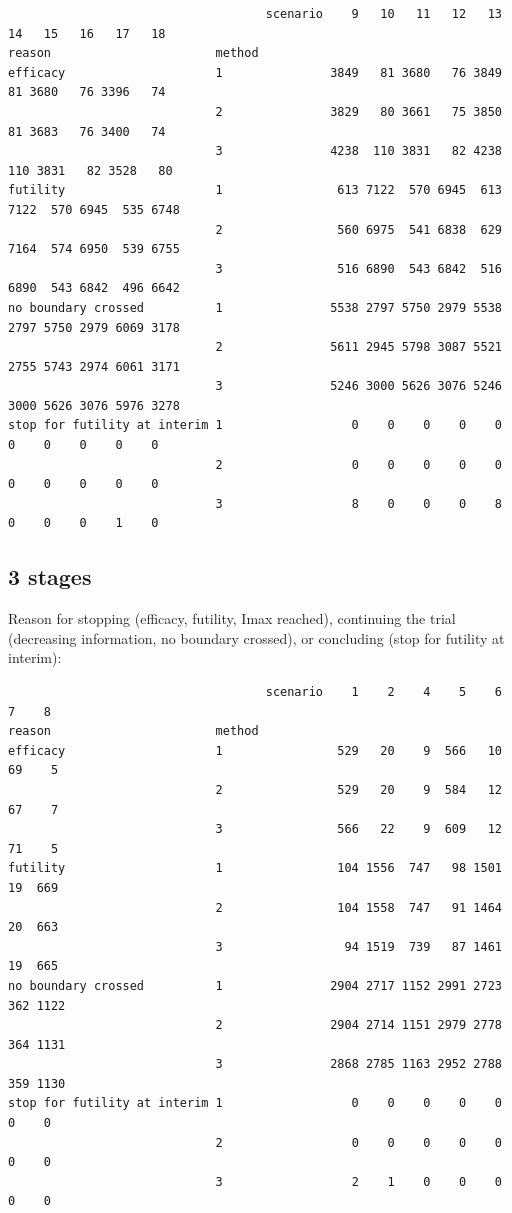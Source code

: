 \documentclass[12pt]{article}
\begin{document}
\begin{verbatim}
                                    scenario    9   10   11   12   13   14   15   16   17   18
reason                       method                                                           
efficacy                     1               3849   81 3680   76 3849   81 3680   76 3396   74
                             2               3829   80 3661   75 3850   81 3683   76 3400   74
                             3               4238  110 3831   82 4238  110 3831   82 3528   80
futility                     1                613 7122  570 6945  613 7122  570 6945  535 6748
                             2                560 6975  541 6838  629 7164  574 6950  539 6755
                             3                516 6890  543 6842  516 6890  543 6842  496 6642
no boundary crossed          1               5538 2797 5750 2979 5538 2797 5750 2979 6069 3178
                             2               5611 2945 5798 3087 5521 2755 5743 2974 6061 3171
                             3               5246 3000 5626 3076 5246 3000 5626 3076 5976 3278
stop for futility at interim 1                  0    0    0    0    0    0    0    0    0    0
                             2                  0    0    0    0    0    0    0    0    0    0
                             3                  8    0    0    0    8    0    0    0    1    0
\end{verbatim}

\clearpage

\subsection{3 stages}
\label{sec:orga3c3574}

Reason for stopping (efficacy, futility, Imax reached), continuing the
trial (decreasing information, no boundary crossed), or concluding
(stop for futility at interim):
\begin{verbatim}
                                    scenario    1    2    4    5    6    7    8
reason                       method                                            
efficacy                     1                529   20    9  566   10   69    5
                             2                529   20    9  584   12   67    7
                             3                566   22    9  609   12   71    5
futility                     1                104 1556  747   98 1501   19  669
                             2                104 1558  747   91 1464   20  663
                             3                 94 1519  739   87 1461   19  665
no boundary crossed          1               2904 2717 1152 2991 2723  362 1122
                             2               2904 2714 1151 2979 2778  364 1131
                             3               2868 2785 1163 2952 2788  359 1130
stop for futility at interim 1                  0    0    0    0    0    0    0
                             2                  0    0    0    0    0    0    0
                             3                  2    1    0    0    0    0    0
\end{verbatim}
\end{document}
